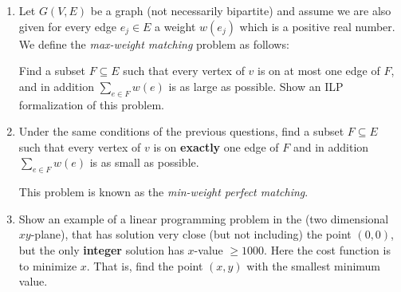 \documentclass[11pt,epic,leqno,eepic,psfig,]{article}
\renewcommand{\i}{\item}
\begin{document}
\begin{enumerate}
\i Let $G(V,E)$ be a graph (not necessarily bipartite) and assume we are also given for every edge $e_j\in E$ a weight $w(e_j )$ which is a positive real number. We define the {\em max-weight matching} problem as follows: 

Find a subset $F\subseteq E$ such that every vertex of $v$ is on at most one edge of $F$, and in addition $\sum_{e\in F} w(e)$ is as large as possible.  
 Show an ILP formalization of this problem. 

\i Under the same conditions of the previous questions, 
find a subset $F\subseteq E$ such that every vertex of $v$ is on {\bf exactly}  one edge of $F$ and in addition $\sum_{e\in F} w(e)$ is as small as possible.

This problem is known as the {\em  min-weight perfect matching}.

\i Show an example of a linear programming problem in the (two dimensional $xy$-plane), that has  solution very close (but not including) the point $(0,0)$, 
 but the only {\bf integer} solution has $x$-value $\geq 1000.$ Here the cost function is to minimize $x$. That is, find the point $(x,y)$ with the smallest minimum value.  



\end{enumerate} 
\end{document}
